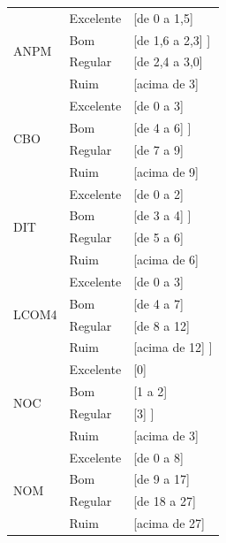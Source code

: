\begin{longtable}{|l|l|l|}
		 \multirow{4}{*}{ANPM} 
		 & Excelente & [de 0 a 1,5] \\
		 & Bom & [de 1,6 a 2,3] ] \\
		 & Regular & [de 2,4 a 3,0]  \\
		 & Ruim & [acima de 3] \\ \hline

		 \multirow{4}{*}{CBO} 
		 & Excelente & [de 0 a 3]  \\
		 & Bom & [de 4 a 6] ] \\
		 & Regular & [de 7 a 9]  \\
		 & Ruim & [acima de 9] \\ \hline

		 \multirow{4}{*}{DIT} 
		 & Excelente & [de 0 a 2]   \\
		 & Bom & [de 3 a 4]  ] \\
		 & Regular & [de 5 a 6]   \\
		 & Ruim & [acima de 6]  \\ \hline

		 \multirow{4}{*}{LCOM4} 
		 & Excelente & [de 0 a 3]  \\
		 & Bom & [de 4 a 7]  \\
		 & Regular & [de 8 a 12]   \\
		 & Ruim & [acima de 12]  ] \\ \hline



		 \multirow{4}{*}{NOC} 
		 & Excelente & [0]  \\
		 & Bom & [1 a 2]   \\
		 & Regular & [3]  ] \\
		 & Ruim & [acima de 3]   \\ \hline



		 \multirow{4}{*}{NOM} 
		 & Excelente & [de 0 a 8]   \\
		 & Bom & [de 9 a 17]   \\
		 & Regular & [de 18 a 27]  \\
		 & Ruim & [acima de 27]   \\ \hline





\end{longtable}
